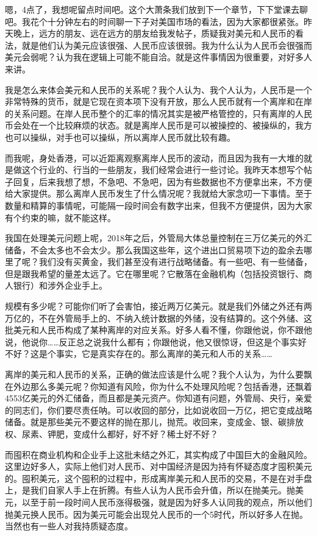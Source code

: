 \documentclass[UTF8, 12pt, a4paper]{ctexrep}
\begin{document}
嗯，4点了，我想呢留点时间吧。这个大萧条我们放到下一个章节，下下堂课去聊吧。我花个十分钟左右的时间聊一下子对美国市场的看法，因为大家都很紧张。昨天晚上，远方的朋友、远在远方的朋友给我发帖子，质疑我对美元和人民币的看法，就是他们认为美元应该很强、人民币应该很弱。我为什么认为人民币会很强而美元会弱呢？认为我在逻辑上可能不能自洽。就是这件事情因为很重要，对好多人来讲。

我是怎么来体会美元和人民币的关系呢？我个人认为、我个人认为，人民币是一个非常特殊的货币，就是它现在资本项下没有开放，那么人民币就有一个离岸和在岸的关系问题。在岸人民币整个的汇率的情况其实是被严格管控的，只有离岸的人民币会处在一个比较麻烦的状态。就是离岸人民币是可以被操控的、被操纵的，我方也可以操纵，对手也可以操纵，所以离岸人民币就比较有趣。

而我呢，身处香港，可以近距离观察离岸人民币的波动，而且因为我有一大堆的就是做这个行业的、行当的一些朋友，我们经常会进行一些讨论。我昨天本想写个帖子回复，后来我想了想，不急吧、不急吧，因为有些数据也不方便拿出来，不方便给大家提供。那么离岸人民币发生了什么情况呢？我就给大家念叨一下事情。至于数量和精算的事情呢，可能隔一段时间会有数字出来，但我不方便提供，因为大家有个约束的嘛，就不能这样。

我国在处理美元问题上呢，2018年之后，外管局大体总量控制在三万亿美元的外汇储备，不会太多也不会太少。那么我国这些年，这个进出口贸易项下边的盈余去哪里了呢？我们没有买黄金，我们甚至没有进行战略储备。有一些吧、有一些储备，但是跟我希望的量差太远了。它在哪里呢？它散落在金融机构（包括投资银行、商人银行）和涉外企业手上。

规模有多少呢？可能你们听了会害怕，接近两万亿美元。就是我们外储之外还有两万亿的，不在外管局手上的、不纳入统计数据的外储，没有结算的。这个外储、这批美元和人民币构成了某种离岸的对应关系。好多人看不懂，你跟他说，你不跟他说，他说你……反正总之说我什么都有；你跟他说，他又很惊讶，但这是个事实好不好？这是个事实，它是真实存在的。那么离岸的美元和人币的关系……

离岸的美元和人民币的关系，正确的做法应该是什么呢？我个人认为，为什么要飘在外边那么多美元呢？你知道有风险，你为什么不处理风险呢？包括香港，还飘着4553亿美元的外汇储备，而且都是美元资产。你知道有问题，外管局、央行，亲爱的同志们，你们要尽责任呐。可以收回的部分，比如说收回一万亿，把它变成战略储备。就是那些美元不要这样的抛在那儿，抛荒。收回来，变成金、银、碳排放权、尿素、钾肥，变成什么都好，好不好？稀土好不好？

而囤积在商业机构和企业手上这批未结之外汇，其实构成了中国巨大的金融风险。这里边好多人，实际上他们对人民币、对中国经济是因为持有怀疑态度才囤积美元的。囤积美元，这个囤积的过程中，形成离岸美元和人民币的交易，不是在对手盘上，是我们自家人手上在折腾。有些人认为人民币会升值，所以在抛美元。抛美元，以至于前一段时间人民币涨得极强，就是因为好多人认同我的观点，所以他们抛美元换人民币。因为美元可能会出现兑人民币的一个5时代，所以好多人在抛。当然也有一些人对我持质疑态度。
\end{document}
